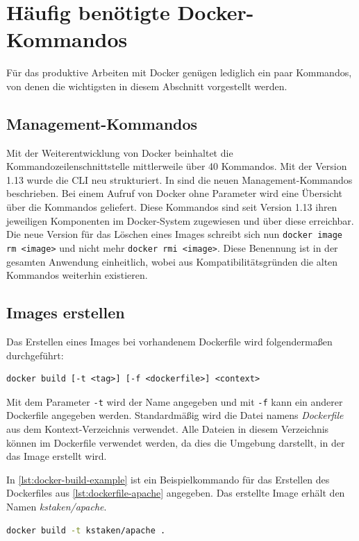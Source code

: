\section{Häufig benötigte Docker-Kommandos}
\label{docker-kommandos}
Für das produktive Arbeiten mit Docker genügen lediglich ein paar Kommandos, von denen die wichtigsten in diesem Abschnitt vorgestellt werden.

\subsection{Management-Kommandos}
Mit der Weiterentwicklung von Docker beinhaltet die Kommandozeilenschnittstelle mittlerweile über 40 Kommandos. Mit der Version 1.13 wurde die CLI neu strukturiert.
In \autocite{docker-1.13:online} sind die neuen Management-Kommandos beschrieben.
Bei einem Aufruf von Docker ohne Parameter wird eine Übersicht über die Kommandos geliefert.
Diese Kommandos sind seit Version 1.13 ihren jeweiligen Komponenten im Docker-System zugewiesen und über diese erreichbar.
Die neue Version für das Löschen eines Images schreibt sich nun \texttt{docker image rm <image>} und nicht mehr \texttt{docker rmi <image>}.
Diese Benennung ist in der gesamten Anwendung einheitlich, wobei aus Kompatibilitätsgründen die alten Kommandos weiterhin existieren.

\subsection{Images erstellen}
Das Erstellen eines Images bei vorhandenem Dockerfile wird folgendermaßen durchgeführt:
\begin{verbatim}
docker build [-t <tag>] [-f <dockerfile>] <context>
\end{verbatim}
Mit dem Parameter \texttt{-t} wird der Name angegeben und mit \texttt{-f} kann ein anderer Dockerfile angegeben werden.
Standardmäßig wird die Datei namens \emph{Dockerfile} aus dem Kontext-Verzeichnis verwendet.
Alle Dateien in diesem Verzeichnis können im Dockerfile verwendet werden, da dies die Umgebung darstellt, in der das Image erstellt wird.

In \cref{lst:docker-build-example} ist ein Beispielkommando für das Erstellen des Dockerfiles aus \cref{lst:dockerfile-apache} angegeben.
Das erstellte Image erhält den Namen \emph{kstaken/apache}.
\begin{lstlisting}[caption=Docker-Build-Beispiel, language=bash, label=lst:docker-build-example]
docker build -t kstaken/apache .
\end{lstlisting}

